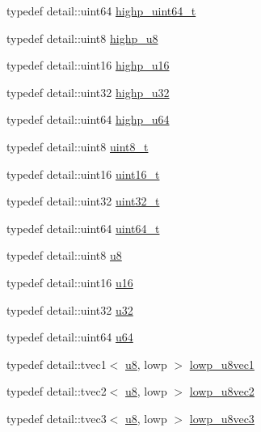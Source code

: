 \begin{CompactItemize}
\item 
typedef detail::uint64 \hyperlink{group__gtc__type__precision_g6e66f40c5909bfc872b068187fa6029e}{highp\_\-uint64\_\-t}
\item 
typedef detail::uint8 \hyperlink{group__gtc__type__precision_g8a60abe782749c504fb5ae51eb8b49cc}{highp\_\-u8}
\item 
typedef detail::uint16 \hyperlink{group__gtc__type__precision_g9da2178d7501d9c0f225fa1a7b70cb45}{highp\_\-u16}
\item 
typedef detail::uint32 \hyperlink{group__gtc__type__precision_ge8e8a2c712653891a03c171795286ac5}{highp\_\-u32}
\item 
typedef detail::uint64 \hyperlink{group__gtc__type__precision_g6006ea883d3c0491791650b2fb84de39}{highp\_\-u64}
\item 
typedef detail::uint8 \hyperlink{group__gtc__type__precision_g93adf6dd9803408f3e3aaf9dedda352b}{uint8\_\-t}
\item 
typedef detail::uint16 \hyperlink{group__gtc__type__precision_gc4eb4f43cae8129b00086dc234d3b8fc}{uint16\_\-t}
\item 
typedef detail::uint32 \hyperlink{group__gtc__type__precision_g822ca53a9ad412504532838906276a99}{uint32\_\-t}
\item 
typedef detail::uint64 \hyperlink{group__gtc__type__precision_g058f57c19e1befdcf12498944bd73e69}{uint64\_\-t}
\item 
typedef detail::uint8 \hyperlink{group__gtc__type__precision_g5e3dc67373d5068997d2d9f41c9024d2}{u8}
\item 
typedef detail::uint16 \hyperlink{group__gtc__type__precision_ge7a1571503f83d2264ddfa705a6b082a}{u16}
\item 
typedef detail::uint32 \hyperlink{group__gtc__type__precision_g54e837745059fd29017bed71cfa0a8db}{u32}
\item 
typedef detail::uint64 \hyperlink{group__gtc__type__precision_g71cedd4972f9cb1a5e14dfe5ab83ecd7}{u64}
\item 
typedef detail::tvec1$<$ \hyperlink{group__gtc__type__precision_g5e3dc67373d5068997d2d9f41c9024d2}{u8}, lowp $>$ \hyperlink{group__gtc__type__precision_gee3cba2c93fa8cb7295671908995197c}{lowp\_\-u8vec1}
\item 
typedef detail::tvec2$<$ \hyperlink{group__gtc__type__precision_g5e3dc67373d5068997d2d9f41c9024d2}{u8}, lowp $>$ \hyperlink{group__gtc__type__precision_g8e5a056cbbcb70dca5c65950fa13a787}{lowp\_\-u8vec2}
\item 
typedef detail::tvec3$<$ \hyperlink{group__gtc__type__precision_g5e3dc67373d5068997d2d9f41c9024d2}{u8}, lowp $>$ \hyperlink{group__gtc__type__precision_gf0d7154052c636edf4a902fc8a4a56f2}{lowp\_\-u8vec3}

\end{CompactItemize}

